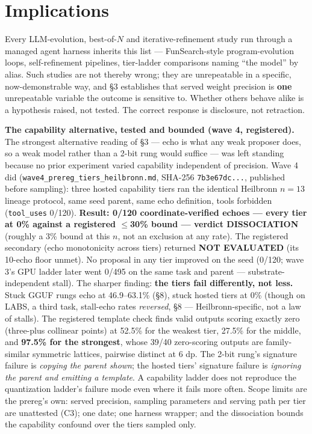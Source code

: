 \section{Implications}

Every LLM-evolution, best-of-$N$ and iterative-refinement study run through a managed agent harness inherits this list --- FunSearch-style program-evolution loops, self-refinement pipelines, tier-ladder comparisons naming ``the model'' by alias. Such studies are not thereby wrong; they are unrepeatable in a specific, now-demonstrable way, and \S3 establishes that served weight precision is \textbf{one} unrepeatable variable the outcome is sensitive to. Whether others behave alike is a hypothesis raised, not tested. The correct response is disclosure, not retraction.

\textbf{The capability alternative, tested and bounded (wave 4, registered).} The strongest alternative reading of \S3 --- echo is what any weak proposer does, so a weak model rather than a 2-bit rung would suffice --- was left standing because no prior experiment varied capability independent of precision. Wave 4 did (\texttt{wave4\_prereg\_tiers\_heilbronn.md}, SHA-256 \texttt{7b3e67dc...}, published before sampling): three hosted capability tiers ran the identical Heilbronn $n=13$ lineage protocol, same seed parent, same echo definition, tools forbidden (\texttt{tool\_uses} 0/120). \textbf{Result: 0/120 coordinate-verified echoes --- every tier at 0\% against a registered $\le$30\% bound --- verdict DISSOCIATION} (roughly a 3\% bound at this $n$, not an exclusion at any rate). The registered secondary (echo monotonicity across tiers) returned \textbf{NOT EVALUATED} (its 10-echo floor unmet). No proposal in any tier improved on the seed (0/120; wave 3's GPU ladder later went 0/495 on the same task and parent --- substrate-independent stall). The sharper finding: \textbf{the tiers fail differently, not less.} Stuck GGUF rungs echo at 46.9--63.1\% (\S8), stuck hosted tiers at 0\% (though on LABS, a third task, stall-echo rates \emph{reversed}, \S8 --- Heilbronn-specific, not a law of stalls). The registered template check finds valid outputs scoring exactly zero (three-plus collinear points) at 52.5\% for the weakest tier, 27.5\% for the middle, and \textbf{97.5\% for the strongest}, whose 39/40 zero-scoring outputs are family-similar symmetric lattices, pairwise distinct at 6 dp. The 2-bit rung's signature failure is \emph{copying the parent shown}; the hosted tiers' signature failure is \emph{ignoring the parent and emitting a template}. A capability ladder does not reproduce the quantization ladder's failure mode even where it fails more often. Scope limits are the prereg's own: served precision, sampling parameters and serving path per tier are unattested (C3); one date; one harness wrapper; and the dissociation bounds the capability confound over the tiers sampled only.

